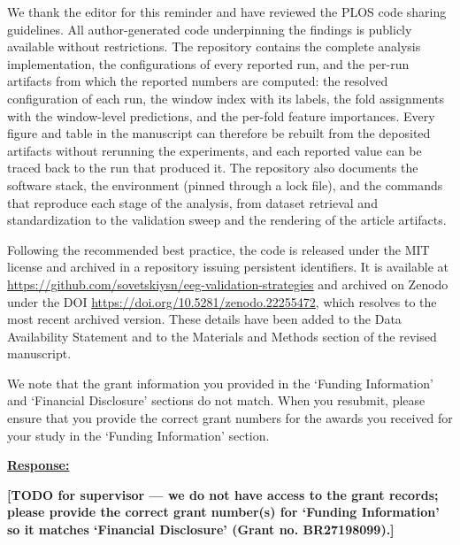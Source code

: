 \documentclass{article}
\begin{document}
We thank the editor for this reminder and have reviewed the PLOS code sharing
guidelines. All author-generated code underpinning the findings is publicly
available without restrictions. The repository contains the complete analysis
implementation, the configurations of every reported run, and the per-run
artifacts from which the reported numbers are computed: the resolved
configuration of each run, the window index with its labels, the fold
assignments with the window-level predictions, and the per-fold feature
importances. Every figure and table in the manuscript can therefore be rebuilt
from the deposited artifacts without rerunning the experiments, and each
reported value can be traced back to the run that produced it. The repository
also documents the software stack, the environment (pinned through a lock
file), and the commands that reproduce each stage of the analysis, from dataset
retrieval and standardization to the validation sweep and the rendering of the
article artifacts.

Following the recommended best practice, the code is released under the MIT
license and archived in a repository issuing persistent identifiers. It is
available at
\url{https://github.com/sovetskiysn/eeg-validation-strategies} and archived on
Zenodo under the DOI \url{https://doi.org/10.5281/zenodo.22255472}, which
resolves to the most recent archived version. These details have been added to
the Data Availability Statement and to the Materials and Methods section of the
revised manuscript.

\vspace{0.3cm}

\begin{cmt}{}{}

We note that the grant information you provided in the `Funding Information'
and `Financial Disclosure' sections do not match.
When you resubmit, please ensure that you provide the correct grant numbers for
the awards you received for your study in the `Funding Information' section.

\end{cmt}
\vspace{0.1cm}
\noindent
\underline{\textbf{Response:}}
\vspace{0.2cm}

\textbf{[TODO for supervisor --- we do not have access to the grant records;
please provide the correct grant number(s) for `Funding Information' so it
matches `Financial Disclosure' (Grant no. BR27198099).]}
\end{document}
